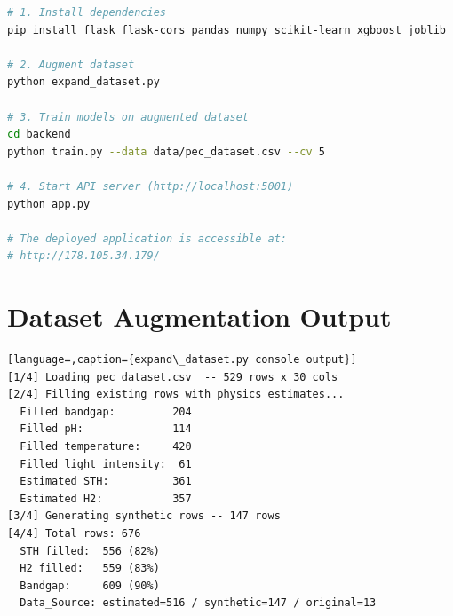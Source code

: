 \begin{lstlisting}[language=bash,caption={Setup and launch instructions}]
# 1. Install dependencies
pip install flask flask-cors pandas numpy scikit-learn xgboost joblib

# 2. Augment dataset
python expand_dataset.py

# 3. Train models on augmented dataset
cd backend
python train.py --data data/pec_dataset.csv --cv 5

# 4. Start API server (http://localhost:5001)
python app.py

# The deployed application is accessible at:
# http://178.105.34.179/
\end{lstlisting}

\section{Dataset Augmentation Output}

\begin{lstlisting}[language=,caption={expand\_dataset.py console output}]
[1/4] Loading pec_dataset.csv  -- 529 rows x 30 cols
[2/4] Filling existing rows with physics estimates...
  Filled bandgap:         204
  Filled pH:              114
  Filled temperature:     420
  Filled light intensity:  61
  Estimated STH:          361
  Estimated H2:           357
[3/4] Generating synthetic rows -- 147 rows
[4/4] Total rows: 676
  STH filled:  556 (82%)
  H2 filled:   559 (83%)
  Bandgap:     609 (90%)
  Data_Source: estimated=516 / synthetic=147 / original=13
\end{lstlisting}
